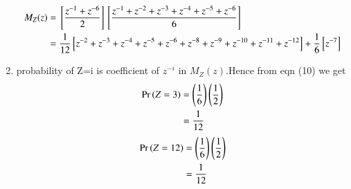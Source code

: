 \documentclass[journal,12pt,onecolumn]{IEEEtran}
\begin{document}
\begin{enumerate}[label=(\alph*)]
\begin{align}
			M_Z(z) &= {}\left[\frac{z^{-1} + z^{-6}}{2}\right]{}\left[\frac{z^{-1} + z^{-2} + z^{-3} + z^{-4} + z^{-5} + z^{-6}}{6}\right] \\
				&= \frac{1}{12}{}\left[z^{-2} + z^{-3} + z^{-4} + z^{-5} + z^{-6} + z^{-8} + z^{-9} + z^{-10} + z^{-11} + z^{-12}\right] + \frac{1}{6}{}\left[z^{-7}\right]
			\end{align}
		\item probability of Z=i is coefficient of $z^{-i}$ in $M_Z(z)$.Hence from eqn (10) we get
	   \begin{align}
		   \Pr\left(Z = 3\right) &= \left(\frac{1}{6}\right)\left(\frac{1}{2}\right) \\ 
		      &= \frac{1}{12}
	      \end{align}      
              \begin{align}
		      \Pr\left(Z = 12\right) &= \left(\frac{1}{6}\right)\left(\frac{1}{2}\right) \\
		      &= \frac{1}{12}
	      \end{align}
 \end{enumerate} 
 
\end{document}
